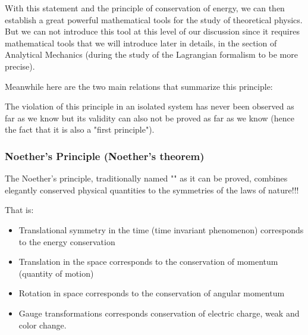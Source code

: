 	With this statement and the principle of conservation of energy, we can then establish a great powerful mathematical tools for the study of theoretical physics. But we can not introduce this tool at this level of our discussion since it requires mathematical tools that we will introduce later in details, in the section of Analytical Mechanics (during the study of the Lagrangian formalism to be more precise).

	Meanwhile here are the two main relations that summarize this principle:
	
	\begin{tcolorbox}[title=Remark,colframe=black,arc=10pt]
	The violation of this principle in an isolated system has never been observed as far as we know but its validity can also not be proved as far as we know (hence the fact that it is also a "first principle").
	\end{tcolorbox}
	
	\subsubsection{Noether's Principle (Noether's theorem)}
	The Noether's principle, traditionally named "" as it can be proved, combines elegantly conserved physical quantities to the symmetries of the laws of nature!!!

	That is:
	\begin{itemize}
		\item Translational symmetry in the time (time invariant phenomenon) corresponds to the energy conservation
	
		\item Translation in the space corresponds to the conservation of momentum (quantity of motion)

		\item Rotation in space corresponds to the conservation of angular momentum
		
		\item Gauge transformations corresponds conservation of electric charge, weak and color change.
	\end{itemize}

